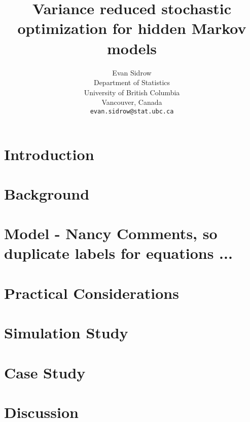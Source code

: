 \documentclass{article}
\title{Variance reduced stochastic optimization for hidden Markov models}
\author{
  Evan Sidrow \\
  Department of Statistics\\
  University of British Columbia\\
  Vancouver, Canada \\
  \texttt{evan.sidrow@stat.ubc.ca} \\
}
\begin{document}
\maketitle


\section{Introduction}


\section{Background}


%

\section{Model - Nancy Comments, so duplicate labels for equations ...}


\section{Practical Considerations}

\label{sec:prac}

\section{Simulation Study}


\section{Case Study}


\section{Discussion}


\newpage


\end{document}
